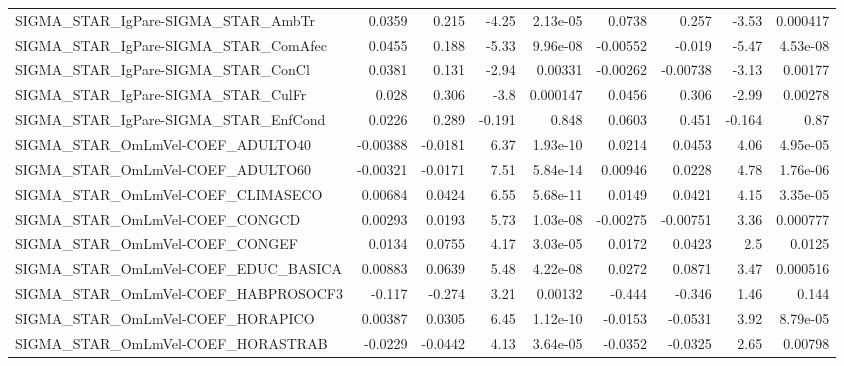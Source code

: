 \begin{tabular}{lrrrrrrrr}
SIGMA\_STAR\_IgPare-SIGMA\_STAR\_AmbTr     &      0.0359 &        0.215 &    -4.25 & 2.13e-05 &     0.0738 &       0.257 &        -3.53 &      0.000417 \\
SIGMA\_STAR\_IgPare-SIGMA\_STAR\_ComAfec   &      0.0455 &        0.188 &    -5.33 & 9.96e-08 &   -0.00552 &      -0.019 &        -5.47 &      4.53e-08 \\
SIGMA\_STAR\_IgPare-SIGMA\_STAR\_ConCl     &      0.0381 &        0.131 &    -2.94 &  0.00331 &   -0.00262 &    -0.00738 &        -3.13 &       0.00177 \\
SIGMA\_STAR\_IgPare-SIGMA\_STAR\_CulFr     &       0.028 &        0.306 &     -3.8 & 0.000147 &     0.0456 &       0.306 &        -2.99 &       0.00278 \\
SIGMA\_STAR\_IgPare-SIGMA\_STAR\_EnfCond   &      0.0226 &        0.289 &   -0.191 &    0.848 &     0.0603 &       0.451 &       -0.164 &          0.87 \\
SIGMA\_STAR\_OmLmVel-COEF\_ADULTO40       &    -0.00388 &      -0.0181 &     6.37 & 1.93e-10 &     0.0214 &      0.0453 &         4.06 &      4.95e-05 \\
SIGMA\_STAR\_OmLmVel-COEF\_ADULTO60       &    -0.00321 &      -0.0171 &     7.51 & 5.84e-14 &    0.00946 &      0.0228 &         4.78 &      1.76e-06 \\
SIGMA\_STAR\_OmLmVel-COEF\_CLIMASECO      &     0.00684 &       0.0424 &     6.55 & 5.68e-11 &     0.0149 &      0.0421 &         4.15 &      3.35e-05 \\
SIGMA\_STAR\_OmLmVel-COEF\_CONGCD         &     0.00293 &       0.0193 &     5.73 & 1.03e-08 &   -0.00275 &    -0.00751 &         3.36 &      0.000777 \\
SIGMA\_STAR\_OmLmVel-COEF\_CONGEF         &      0.0134 &       0.0755 &     4.17 & 3.03e-05 &     0.0172 &      0.0423 &          2.5 &        0.0125 \\
SIGMA\_STAR\_OmLmVel-COEF\_EDUC\_BASICA    &     0.00883 &       0.0639 &     5.48 & 4.22e-08 &     0.0272 &      0.0871 &         3.47 &      0.000516 \\
SIGMA\_STAR\_OmLmVel-COEF\_HABPROSOCF3    &      -0.117 &       -0.274 &     3.21 &  0.00132 &     -0.444 &      -0.346 &         1.46 &         0.144 \\
SIGMA\_STAR\_OmLmVel-COEF\_HORAPICO       &     0.00387 &       0.0305 &     6.45 & 1.12e-10 &    -0.0153 &     -0.0531 &         3.92 &      8.79e-05 \\
SIGMA\_STAR\_OmLmVel-COEF\_HORASTRAB      &     -0.0229 &      -0.0442 &     4.13 & 3.64e-05 &    -0.0352 &     -0.0325 &         2.65 &       0.00798 \\

\end{tabular}

